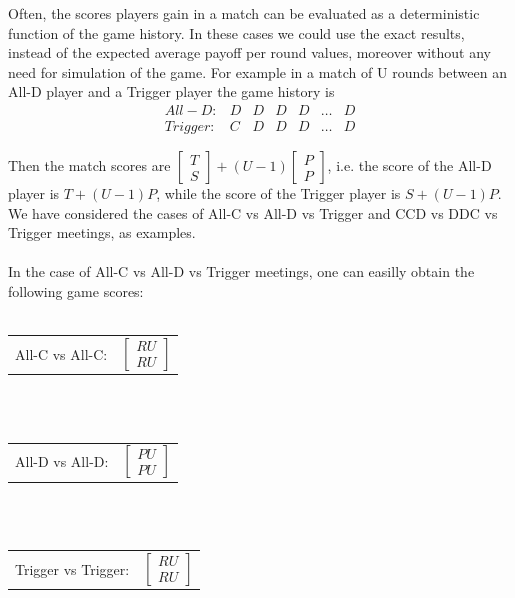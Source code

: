 \documentclass[12pt]{report}
\begin{document}
Often, the scores players gain in a match can be evaluated as a deterministic function of the game history. In these cases we could use the exact results, instead of the expected average payoff per round values, moreover without any need for simulation of the game. For example in a match of U rounds between an All-D player and a Trigger player the game history is 
$$
\begin{matrix}
All-D: & D & D & D & D & \dots & D \\
Trigger: & C & D & D & D & \dots & D
\end{matrix}
$$

Then the match scores are  $\begin{bmatrix}
T \\
S 
\end{bmatrix}  +(U-1)\begin{bmatrix}
P \\
P 
\end{bmatrix}$, i.e. the score of the All-D player is $T+(U-1)P$, while the score of the Trigger player is $S+(U-1)P$. We have considered the cases of All-C vs All-D vs Trigger and CCD vs DDC vs Trigger meetings, as examples.
\\\\
In the case of All-C vs All-D vs Trigger meetings, one can easilly obtain the following game scores:
\\\\
\begin{tabular}{c l}
All-C vs All-C: & $\begin{bmatrix}
    RU\\
    RU
\end{bmatrix}$\\
\end{tabular}
\\\\
\begin{tabular}{c l}
All-D vs All-D: & $\begin{bmatrix}
    PU\\
    PU
\end{bmatrix}$\\
\end{tabular}
\\\\
\begin{tabular}{c l}
Trigger vs Trigger: & $\begin{bmatrix}
    RU\\
    RU
\end{bmatrix}$\\
\end{tabular}
\end{document}
